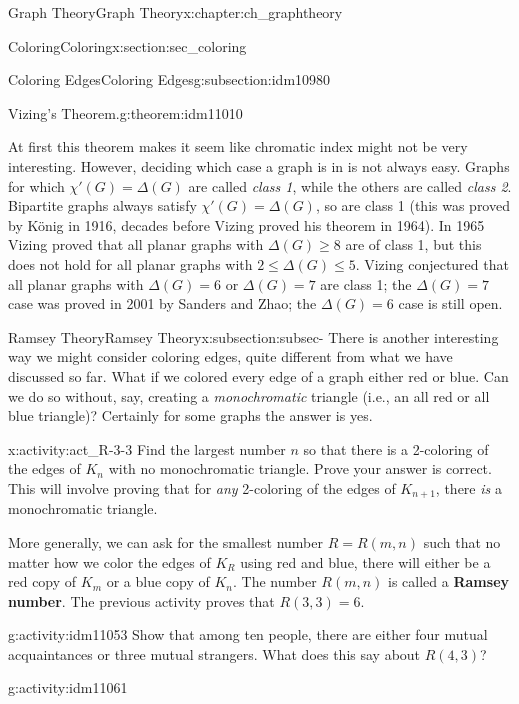 \documentclass[oneside,10pt,]{book}
\newcommand{\terminology}[1]{\textbf{#1}}
\numberwithin{equation}{chapter}
\begin{document}
\begin{chapterptx}{Graph Theory}{}{Graph Theory}{}{}{x:chapter:ch_graphtheory}
\begin{sectionptx}{Coloring}{}{Coloring}{}{}{x:section:sec_coloring}
\begin{subsectionptx}{Coloring Edges}{}{Coloring Edges}{}{}{g:subsection:idm10980}
\begin{theorem}{Vizing's Theorem.}{}{g:theorem:idm11010}
\end{theorem}
At first this theorem makes it seem like chromatic index might not be very interesting. However, deciding which case a graph is in is not always easy. Graphs for which \(\chi'(G) = \Delta(G)\) are called \emph{class 1}, while the others are called \emph{class 2}. Bipartite graphs always satisfy \(\chi'(G) = \Delta(G)\), so are class 1 (this was proved by König in 1916, decades before Vizing proved his theorem in 1964). In 1965 Vizing proved that all planar graphs with \(\Delta(G) \ge 8\) are of class 1, but this does not hold for all planar graphs with \(2 \le \Delta(G) \le 5\). Vizing conjectured that all planar graphs with \(\Delta(G) = 6\) or \(\Delta(G) = 7\) are class 1; the \(\Delta(G) = 7\) case was proved in 2001 by Sanders and Zhao; the \(\Delta(G) = 6\) case is still open.%
\end{subsectionptx}
%
%
\typeout{************************************************}
\typeout{************************************************}
%
\begin{subsectionptx}{Ramsey Theory}{}{Ramsey Theory}{}{}{x:subsection:subsec-}
There is another interesting way we might consider coloring edges, quite different from what we have discussed so far. What if we colored every edge of a graph either red or blue. Can we do so without, say, creating a \emph{monochromatic} triangle (i.e., an all red or all blue triangle)? Certainly for some graphs the answer is yes.%
\begin{activity}{}{x:activity:act_R-3-3}%
Find the largest number \(n\) so that there is a 2-coloring of the edges of \(K_n\) with no monochromatic triangle.  Prove your answer is correct.  This will involve proving that for \emph{any} 2-coloring of the edges of \(K_{n+1}\), there \emph{is} a monochromatic triangle.%
\end{activity}
More generally, we can ask for the smallest number \(R = R(m,n)\) such that no matter how we color the edges of \(K_R\) using red and blue, there will either be a red copy of \(K_m\) or a blue copy of \(K_n\).  The number \(R(m,n)\) is called a \terminology{Ramsey number}.  The previous activity proves that \(R(3,3) = 6\).%
\begin{activity}{}{g:activity:idm11053}%
Show that among ten people, there are either four mutual acquaintances or three mutual strangers.  What does this say about \(R(4,3)\)?%
\end{activity}
\begin{activity}{}{g:activity:idm11061}%

\end{activity}
\end{subsectionptx}
\end{sectionptx}
\end{chapterptx}
\end{document}
